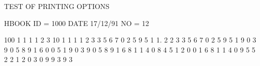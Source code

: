 \begin{Listing}
\newpage

 TEST OF PRINTING OPTIONS                                                        
 
 HBOOK     ID =      1000                                        DATE  17/12/91              NO =  12
 
                         100                                                                       1   1   1   1   2   3
                          10                               1   1   1   1   2   3   3   5   6   7   0   2   5   9   5   1
                           1.  2   2   3   3   5   6   7   0   2   5   9   5   1   9   0   3   9   0   5   8   9   1   6
                           0   0   5   1   9   0   3   9   0   5   8   9   1   6   8   1   1   4   0   8   4   5   1   2
                           0   0   1   6   8   1   1   4   0   9   5   5   2   2   1   2   0   3   0   9   9   3   9   3
 

\end{Listing}
